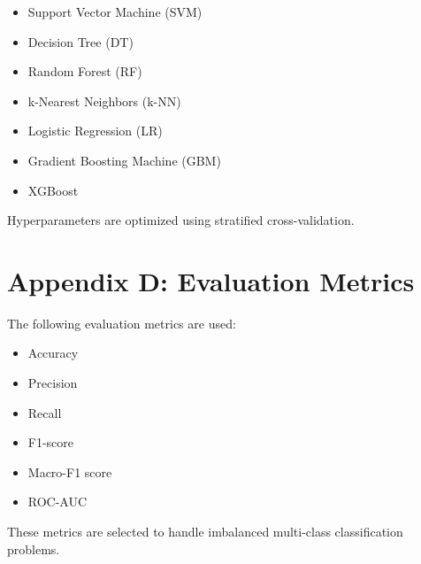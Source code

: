 \begin{itemize}
\item Support Vector Machine (SVM)
\item Decision Tree (DT)
\item Random Forest (RF)
\item k-Nearest Neighbors (k-NN)
\item Logistic Regression (LR)
\item Gradient Boosting Machine (GBM)
\item XGBoost
\end{itemize}

Hyperparameters are optimized using stratified cross-validation.

\section{Appendix D: Evaluation Metrics}

The following evaluation metrics are used:

\begin{itemize}
\item Accuracy
\item Precision
\item Recall
\item F1-score
\item Macro-F1 score
\item ROC-AUC
\end{itemize}

These metrics are selected to handle imbalanced multi-class classification problems.

\clearpage
